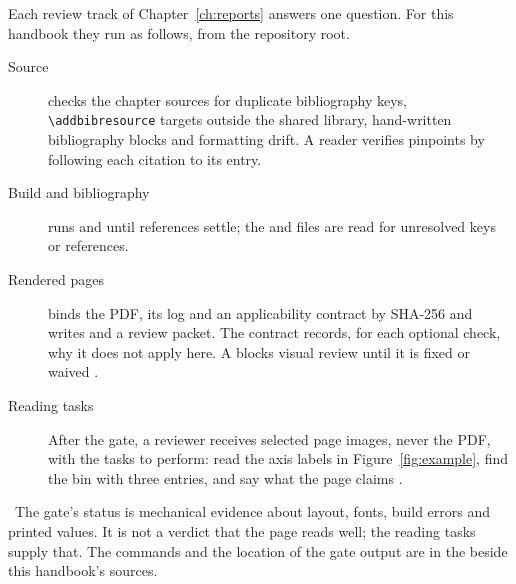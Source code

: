 \begin{headline}
  Each review track of Chapter~\ref{ch:reports} answers one question. For this handbook
  they run as follows, from the repository root.
\end{headline}

\begin{description}
  \item[Source]  checks the chapter
        sources for duplicate bibliography keys, \texttt{\textbackslash addbibresource} targets
        outside the shared library, hand-written bibliography blocks and formatting drift. A
        reader verifies pinpoints by following each citation to its entry.
  \item[Build and bibliography]  runs  and  until
        references settle; the  and  files are read for unresolved keys or
        references.
  \item[Rendered pages]  binds the PDF,
        its log and an applicability contract by SHA-256 and writes  and a review
        packet. The contract records, for each optional check, why it does not apply here. A
         blocks visual review until it is fixed or waived \cite[Command;
          Rules]{skill:render-workflow}.
  \item[Reading tasks] After the gate, a reviewer receives selected page images, never the PDF,
        with the tasks to perform: read the axis labels in Figure~\ref{fig:example}, find the bin
        with three entries, and say what the page claims \cite[Figure and page
          tasks]{skill:visual-review}.
\end{description}

\review\ The gate's status is mechanical evidence about layout, fonts, build errors and
printed values. It is not a verdict that the page reads well; the reading tasks supply that.
The commands and the location of the gate output are in the  beside this
handbook's sources.
